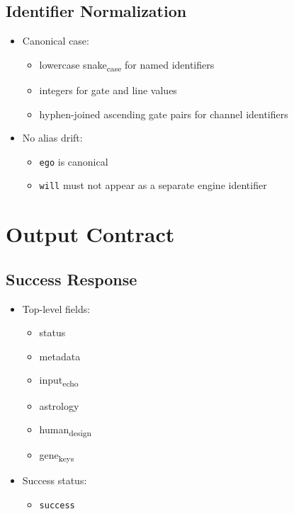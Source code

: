 \documentclass[11pt]{article}
\begin{document}
\subsection{Identifier Normalization}
\label{sec:orgb65d28f}
\begin{itemize}
\item Canonical case:
\begin{itemize}
\item lowercase snake\textsubscript{case} for named identifiers
\item integers for gate and line values
\item hyphen-joined ascending gate pairs for channel identifiers
\end{itemize}
\item No alias drift:
\begin{itemize}
\item \texttt{ego} is canonical
\item \texttt{will} must not appear as a separate engine identifier
\end{itemize}
\end{itemize}
\section{Output Contract}
\label{sec:orgb07c0f4}
\subsection{Success Response}
\label{sec:org33105b0}
\begin{itemize}
\item Top-level fields:
\begin{itemize}
\item status
\item metadata
\item input\textsubscript{echo}
\item astrology
\item human\textsubscript{design}
\item gene\textsubscript{keys}
\end{itemize}
\item Success status:
\begin{itemize}
\item \texttt{success}
\end{itemize}
\end{itemize}
\end{document}

